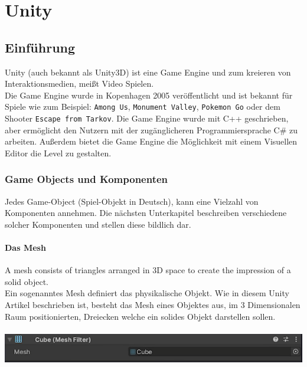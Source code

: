 \pagebreak
{}
\chapter{Unity}

\section{Einführung}
Unity (auch bekannt als Unity3D) ist eine Game Engine und  zum kreieren von Interaktionsmedien, meißt Video Spielen. \Cite[][A history of the unity game engine]{haas2014history} \\

Die Game Engine wurde in Kopenhagen 2005 veröffentlicht und ist bekannt für Spiele wie zum Beispiel: \verb+Among Us+, \verb+Monument Valley+, \verb+Pokemon Go+ oder dem Shooter \verb+Escape from Tarkov+. Die Game Engine wurde mit C++ geschrieben, aber ermöglicht den Nutzern mit der zugänglicheren Programmiersprache C\# zu arbeiten. Außerdem bietet die Game Engine die Möglichkeit mit einem Visuellen Editor die Level zu gestalten.

\subsection{Game Objects und Komponenten}
Jedes Game-Object (Spiel-Objekt in Deutsch), kann eine Vielzahl von Komponenten annehmen. Die nächsten Unterkapitel beschreiben verschiedene solcher Komponenten und stellen diese bildlich dar.

\subsubsection{Das Mesh}
\glqq A mesh consists of triangles arranged in 3D space to create the impression of a solid object. \grqq \Cite[][Anatomy of a Mesh, Unity Documentation]{unitydoc}\\
Ein sogenanntes Mesh definiert das physikalische Objekt. Wie in diesem Unity Artikel beschrieben ist, besteht das Mesh eines Objektes aus, im 3 Dimensionalen Raum positionierten, Dreiecken welche ein solides Objekt darstellen sollen.\\\\
\noindent
\includegraphics[width=1\linewidth]{chapters/14/Images/Mesh2.png}

